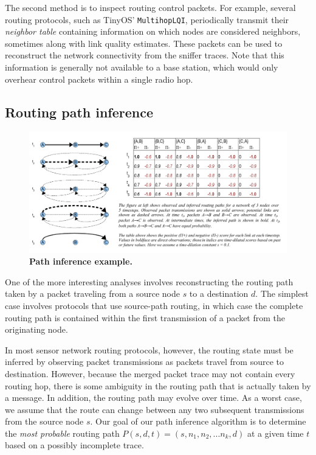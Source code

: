 The second method is to inspect routing control packets. For example, 
several routing protocols, such as TinyOS' {\tt MultihopLQI}, 
periodically transmit their {\em neighbor table} containing
information on which nodes are considered neighbors, sometimes 
along with link quality estimates. These packets can be used
to reconstruct the network connectivity from the sniffer traces. Note
that this information is generally not available to a base station, which 
would only overhear control packets within a single radio hop.

\subsection{Routing path inference}
\label{sec-livenet-path-inference}

\begin{figure}
\begin{center}
\includegraphics[width=0.9\hsize]{./resources/livenet-sensys07/figs/pathinference/path-example.pdf}
\caption{{\small\bf Path inference example.}}
\label{fig-pathinference-example}
\end{center}
\end{figure}

One of the more interesting analyses involves reconstructing
the routing path taken by a packet traveling from a source node $s$
to a destination $d$. The simplest case involves protocols that use
source-path routing, in which case the complete routing path is
contained within the first transmission of a packet from the
originating node. 


In most sensor network routing protocols, however, the
routing state must be inferred by observing packet transmissions as
packets travel from source to destination.
However, because the merged packet trace may not contain every routing 
hop, there is some ambiguity in the routing path that is
actually taken by a message. In addition, the routing path may evolve
over time. As a worst case, we assume that the route can change between 
any two subsequent transmissions from the source node $s$. 
Our goal of our path inference algorithm is to determine the {\em most
probable} routing path $P(s,d,t) = ( s, n_1, n_2, ... n_k, d )$ 
at a given time $t$ based on a possibly incomplete trace.


